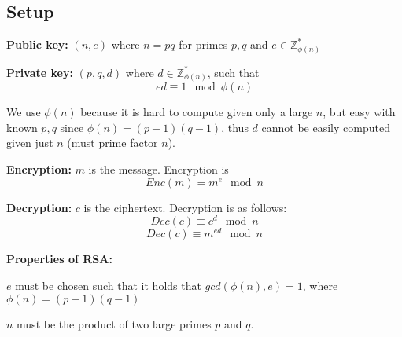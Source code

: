 
\subsection*{Setup}
\textbf{Public key:} $(n, e)$ where $n = pq$ for primes $p, q$ and $e \in \mathbb{Z}_{\phi(n)}^*$

\textbf{Private key:} $(p, q, d)$ where $d \in \mathbb{Z}_{\phi(n)}^*$, such that
\[ ed \equiv 1 \mod \phi(n) \]

We use $\phi(n)$ because it is hard to compute given only a large $n$, but easy with known $p, q$ since $\phi(n) = (p-1)(q-1)$, thus $d$ cannot be easily computed given just $n$ (must prime factor $n$).

\textbf{Encryption:} $m$ is the message. Encryption is
\[ Enc(m) = m^e \mod n \]

\textbf{Decryption:} $c$ is the ciphertext. Decryption is as follows:
\[ Dec(c) \equiv c^d \mod n \]
\[ Dec(c) \equiv m^{ed} \mod n \]

\textbf{Properties of RSA:}

$e$ must be chosen such that it holds that $gcd(\phi(n),e) = 1$, where
$\phi(n) = (p - 1)(q - 1)$

$n$ must be the product of two large primes $p$ and $q$.
